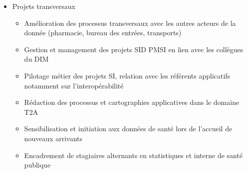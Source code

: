 \documentclass[11pt,a4paper]{moderncv}
\begin{document}
{\begin{itemize}[leftmargin=-0.5in]
\begin{itemize}[leftmargin=0.4in]
\item package python \href{https://guillaumepressiat.github.io/pypmsi/}{pypmsi} et \href{https://github.com/GuillaumePressiat/refpymsi}{refpymsi}  pour lire et analyser les données et référentiels PMSI
\end{itemize}
\item {Projets transversaux}
\begin{itemize}[leftmargin=0.4in]
\item Amélioration des processus transversaux avec les autres acteurs de la donnée (pharmacie, bureau des entrées, transports)
\item Gestion et management des projets SID PMSI en lien avec les collègues du DIM
\item Pilotage métier des projets SI, relation avec les référents applicatifs notamment sur l'interopérabilité
\item Rédaction des processus et cartographies applicatives dans le domaine T2A
\item Sensibilisation et initiation aux données de santé lors de l’accueil de nouveaux arrivants
\item Encadrement de stagiaires alternants en statistiques et interne de santé publique
\end{itemize}
\end{itemize}}

 \vspace{5mm}
\end{document}
